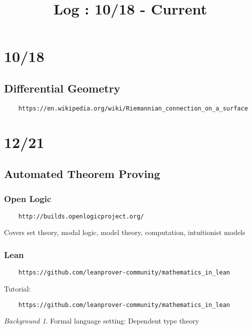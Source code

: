 \documentclass[11pt]{article}
\title{Log : 10/18 - Current}
\theoremstyle{remark}
\newtheorem{back}{Background}
\begin{document}
\maketitle

\section{10/18}

\subsection{Differential Geometry}

\begin{verbatim}
	https://en.wikipedia.org/wiki/Riemannian_connection_on_a_surface
\end{verbatim}

\section{12/21}

\subsection{Automated Theorem Proving}

\subsubsection{Open Logic}

\begin{verbatim}
	http://builds.openlogicproject.org/
\end{verbatim}

Covers set theory, modal logic, model theory, computation, intuitionist models


\subsubsection{Lean}

\begin{verbatim}
	https://github.com/leanprover-community/mathematics_in_lean
\end{verbatim}

Tutorial: 

\begin{verbatim}
	https://github.com/leanprover-community/mathematics_in_lean
\end{verbatim}

\begin{back}
	Formal language setting: Dependent type theory
\end{back}
\end{document}
